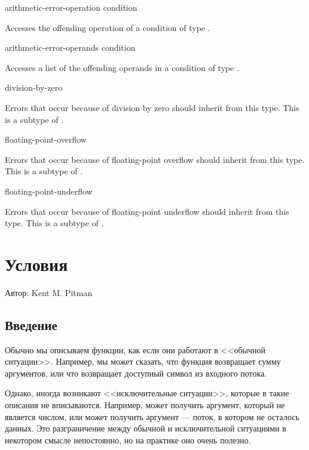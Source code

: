 \begin{defun}[Function]
arithmetic-error-operation condition

Accesses the offending operation of a condition of type .
\end{defun}

\begin{defun}[Function]
arithmetic-error-operands condition

Accesses a list of the offending operands in a condition of type
.
\end{defun}

\begin{defun}[Type]
division-by-zero

Errors that occur because of division by zero should inherit from this type.
This is a subtype of .  
\end{defun}

\begin{defun}[Type]
floating-point-overflow

Errors that occur because of floating-point overflow should inherit from this
type. This is a subtype of .
\end{defun}

\begin{defun}[Type]
floating-point-underflow

Errors that occur because of floating-point underflow should inherit from this
type. This is a subtype of .
\end{defun}

\else %

\chapter{Условия}
\label{CONDITION}

Автор: Kent M. Pitman


\section{Введение}

Обычно мы описываем функции, как если они работают в <<обычной
ситуации>>. Например, мы может сказать, что функция \cdf{+} возвращает сумму
аргументов, или что  возвращает доступный символ из входного
потока.

Однако, иногда возникают <<исключительные ситуации>>, которые в такие описания
не вписываются. Например, \cdf{+} может получить аргумент, который не является
числом, или  может получить аргумент --- поток, в котором не
осталось данных. Это разграничение между обычной и исключительной ситуациями в
некотором смысле непостоянно, но на практике оно очень полезно.


